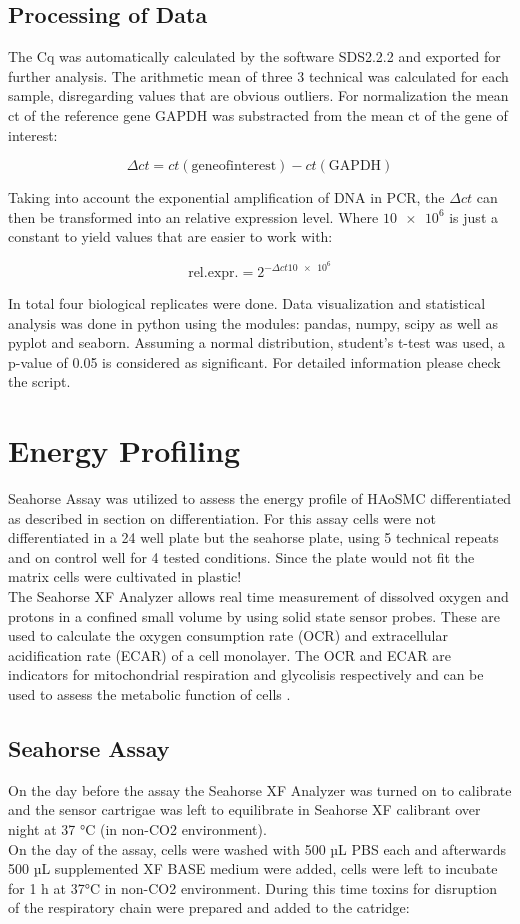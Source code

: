    \subsection{Processing of Data}
    The Cq was automatically calculated by the software SDS2.2.2 and exported for further analysis. The arithmetic  mean of three 3 technical was calculated for each sample, disregarding values that are obvious outliers. For normalization the mean ct of the reference gene GAPDH was substracted from the mean ct of the gene of interest:

    $$\Delta ct = ct(\mathrm{gene of interest}) - ct(\mathrm{GAPDH})$$

    Taking into account the exponential amplification of DNA in PCR, the $\Delta ct$ can then be transformed into an relative expression level. Where $\num{10e6}$ is just a constant to yield values that are easier to work with:

    $$\mathrm{rel. expr.} = 2^{-\Delta ct\num{10e6}}$$

    In total four biological replicates were done. Data visualization and statistical analysis was done in python using the modules: pandas, numpy, scipy as well as pyplot and seaborn. Assuming a normal distribution, student's t-test was used, a p-value of 0.05 is considered as significant. For detailed information please check the script.

\section{Energy Profiling}
\label{sec:seahorse}
Seahorse Assay was utilized to assess the energy profile of HAoSMC differentiated as described in section on differentiation. For this assay cells were not differentiated in a 24 well plate but the seahorse plate, using 5 technical repeats and on control well for 4 tested conditions. Since the plate would not fit the matrix cells were cultivated in plastic!\\
The Seahorse XF Analyzer allows real time measurement of dissolved oxygen and protons in a confined small volume by using solid state sensor probes. These are used to calculate the oxygen consumption rate (OCR) and extracellular acidification rate (ECAR) of a cell monolayer. The OCR and ECAR are indicators for mitochondrial respiration and glycolisis respectively and can be used to assess the metabolic function of cells \cite{HowAgilentSeahorse}.

    \subsection{Seahorse Assay}
    On the day before the assay the Seahorse XF Analyzer was turned on to calibrate and the sensor cartrigae was left to equilibrate in Seahorse XF calibrant over night at 37 °C (in non-CO2 environment).\\
    On the day of the assay, cells were washed with 500 µL PBS each and afterwards 500 µL supplemented XF BASE medium were added, cells were left to incubate for 1 h at 37°C in non-CO2 environment. During this time toxins for disruption of the respiratory chain were prepared and added to the catridge:

